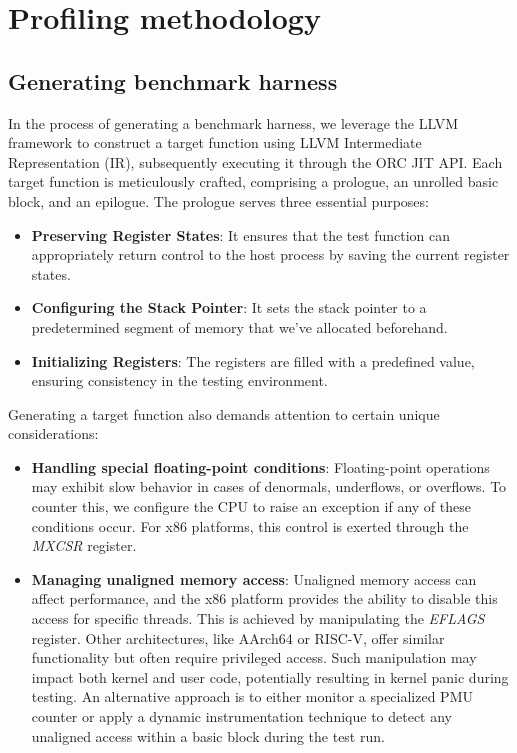 \section{Profiling methodology}

\subsection{Generating benchmark harness}

In the process of generating a benchmark harness, we leverage the LLVM framework to construct a target 
function using LLVM Intermediate Representation (IR), subsequently executing it through the ORC JIT API. 
Each target function is meticulously crafted, comprising a prologue, an unrolled basic block, and an 
epilogue. The prologue serves three essential purposes:

\begin{itemize}
	\item \textbf{Preserving Register States}: It ensures that the test function can appropriately return
	       control to the host process by saving the current register states.
	\item \textbf{Configuring the Stack Pointer}: It sets the stack pointer to a predetermined segment of
	       memory that we've allocated beforehand.
	\item \textbf{Initializing Registers}: The registers are filled with a predefined value, ensuring
	       consistency in the testing environment.
\end{itemize}

Generating a target function also demands attention to certain unique considerations:
\begin{itemize}
	\item \textbf{Handling special floating-point conditions}: Floating-point operations may exhibit slow behavior in cases of denormals, underflows, or overflows. To counter this, we configure the CPU to raise an exception if any of these conditions occur. For x86 platforms, this control is exerted through the \textit{MXCSR} register.
	\item \textbf{Managing unaligned memory access}: Unaligned memory access can affect performance, and the x86 platform provides the ability to disable this access for specific threads. This is achieved by manipulating the \textit{EFLAGS} register. Other architectures, like AArch64 or RISC-V, offer similar functionality but often require privileged access. Such manipulation may impact both kernel and user code, potentially resulting in kernel panic during testing. An alternative approach is to either monitor a specialized PMU counter or apply a dynamic instrumentation technique to detect any unaligned access within a basic block during the test run.
\end{itemize}

